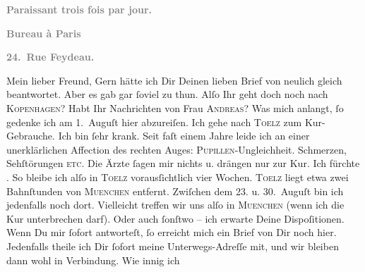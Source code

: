 \begin{ledgroupsized}[t]{13cm}
           \pstart
           \begin{otherlanguage}{french}\textcolor{gray}{\textbf{\textbf{Paraissant trois fois par jour.}}}\end{otherlanguage}\pend
           \pstart
           \begin{otherlanguage}{french}\textcolor{gray}{\textbf{\textbf{Bureau à Paris}}}\end{otherlanguage}\pend
           \pstart
           \begin{otherlanguage}{french}\textcolor{gray}{\textbf{\textbf{24. Rue Feydeau.}}}\end{otherlanguage}\pend
           \pstart\center{}Mein lieber Freund,\pend\pstart
           Gern hätte ich Dir Deinen lieben Brief von neulich gleich beantwortet. Aber es gab
               gar ſoviel zu thun.\pend
           \pstart
           Alſo Ihr geht doch noch nach \textsc{Kopenhagen}? Habt Ihr Nachrichten von Frau \textsc{Andreas}?\pend
           \pstart
           Was mich anlangt, ſo gedenke ich am 1. Auguſt hier
               abzureiſen. Ich gehe nach \textsc{Toelz} zum Kur-Gebrauche. Ich bin ſehr krank. Seit faſt einem Jahre leide ich an einer
               unerklärlichen Affection des rechten Auges: \textsc{Pupillen}-Ungleichheit. Schmerzen, {\pb}Sehſtörungen \textsc{etc}. Die  Ärzte ſagen mir nichts u. drängen nur zur Kur.
               Ich fürchte \label{K_L02741-1v}\label{K_L02741-1h}.\pend
           \pstart
           So bleibe ich alſo in \textsc{Toelz} vorausſichtlich vier Wochen. \textsc{Toelz} liegt etwa zwei Bahnſtunden von \textsc{Muenchen} entfernt. Zwiſchen dem 23. u. 30. Auguſt bin ich jedenfalls noch dort. Vielleicht
               treffen wir uns alſo in \textsc{Muenchen} (wenn ich die Kur unterbrechen darf). Oder auch ſonſtwo – ich erwarte Deine
               Dispoſitionen. Wenn Du mir ſofort antworteſt, ſo erreicht mich ein Brief von Dir noch
               hier. Jedenfalls theile ich Dir {\pb}ſofort meine  Unterwegs-Adreſſe mit, und wir bleiben dann wohl in Verbindung. Wie innig ich

\end{ledgroupsized}
